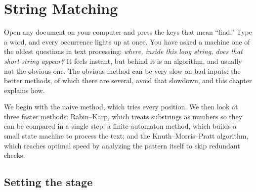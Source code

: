 \chapter{String Matching}

Open any document on your computer and press the keys that mean ``find.'' Type a
word, and every occurrence lights up at once. You have asked a machine one
of the oldest questions in text processing: \emph{where, inside this long string,
does that short string appear?} It feels instant, but behind it is an
algorithm, and usually not the obvious one. The obvious method can be very slow
on bad inputs; the better methods, of which there are several, avoid that
slowdown, and this chapter explains how.

We begin with the naive method, which tries every position. We then look at three faster methods: Rabin--Karp, which treats substrings as numbers so they can be compared in a single step; a finite-automaton method, which builds a small state machine to process the text; and the Knuth--Morris--Pratt algorithm, which reaches optimal speed by analyzing the pattern itself to skip redundant checks.

\chapterline

\section{Setting the stage}
\label{ch31:setup}

